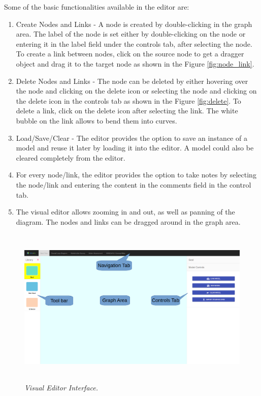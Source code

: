 \documentclass[a4paper]{article}
\begin{document}
Some of the basic functionalities available in the editor are:
\begin{enumerate}
	\item Create Nodes and Links - A node is created by double-clicking in the graph area. The label of the node is set either by double-clicking on the node or entering it in the label field under the controls tab, after selecting the node. To create a link between nodes, click on the source node to get a dragger object and drag it to the target node as shown in the Figure \ref{fig:node_link}.
		
	\item Delete Nodes and Links - The node can be deleted by either hovering over the node and clicking on the delete icon or selecting the node and clicking on the delete icon in the controls tab as shown in the Figure \ref{fig:delete}. To delete a link, click on the delete icon after selecting the link. The white bubble on the link allows to bend them into curves.
	
	\item Load/Save/Clear - The editor provides the option to save an instance of a model and reuse it later by loading it into the editor. A model could also be cleared completely from the editor.

	\item For every node/link, the editor provides the option to take notes by selecting the node/link and entering the content in the comments field in the control tab. 
	
	\item The visual editor allows zooming in and out, as well as panning of the diagram. The nodes and links can be dragged around in the graph area. 
	
\end{enumerate} 

\begin{figure}[H]
\begin{center}
\includegraphics[height=3in,width=5in]{img/layout.png}
\caption{\small \sl Visual Editor Interface.\label{fig:layout}}
\end{center}
\end{figure}
\end{document}
